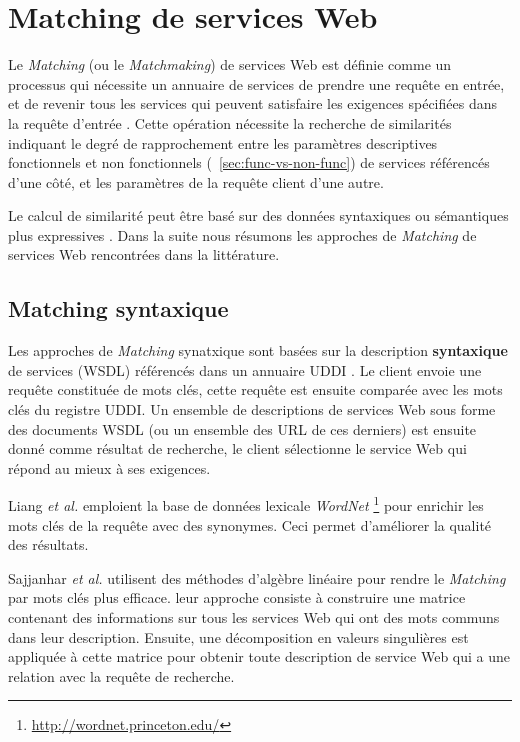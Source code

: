 \section{Matching de services Web}
\label{sec:ws-matching}
Le \textit{Matching} (ou le \textit{Matchmaking}) de services Web est
définie comme un processus qui nécessite un annuaire de services de
prendre une requête en entrée, et de revenir tous les services qui
peuvent satisfaire les exigences spécifiées dans la requête d'entrée
\cite{li2004software}. Cette opération nécessite la recherche de
similarités indiquant le degré de rapprochement entre les paramètres
descriptives fonctionnels et non fonctionnels
(~\ref{sec:func-vs-non-func}) de services référencés d'une côté, et
les paramètres de la requête client d'une autre.

Le calcul de similarité peut être basé sur des données syntaxiques ou
sémantiques plus expressives \cite{elie2010}. Dans la suite nous
résumons les approches de \textit{Matching} de services Web
rencontrées dans la littérature.

  \subsection{Matching syntaxique}
  \label{sec:matching-syntactique}
  Les approches de \textit{Matching} synatxique sont basées sur la
  description \textbf{syntaxique} de services (\textsc{WSDL})
  référencés dans un annuaire \textsc{UDDI} \cite{clement2004uddi}. Le
  client envoie une requête constituée de mots clés, cette requête est
  ensuite comparée avec les mots clés du registre \textsc{UDDI}. Un
  ensemble de descriptions de services Web sous forme des documents
  \textsc{WSDL} (ou un ensemble des \textsc{URL} de ces derniers) est
  ensuite donné comme résultat de recherche, le client sélectionne le
  service Web qui répond au mieux à ses exigences.

  Liang \textit{et al.} \cite{DBLP:journals/jwsr/LiangCSCL04}
  emploient la base de données lexicale \textit{WordNet}
  \footnote{\url{http://wordnet.princeton.edu/}}
  \cite{miller1990introduction} pour enrichir les mots clés de la
  requête avec des synonymes. Ceci permet d'améliorer la qualité des
  résultats.

  Sajjanhar \textit{et al.} \cite{sajjanhar2004algorithm} utilisent
  des méthodes d'algèbre linéaire pour rendre le \textit{Matching} par
  mots clés plus efficace. leur approche consiste à construire une
  matrice contenant des informations sur tous les services Web qui ont
  des mots communs dans leur description. Ensuite, une décomposition
  en valeurs singulières est appliquée à cette matrice pour obtenir
  toute description de service Web qui a une relation avec la requête
  de recherche.

